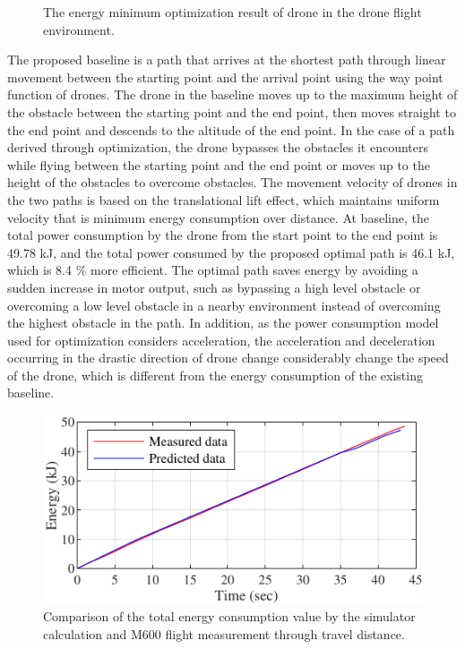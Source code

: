 \documentclass[journal]{./template/IEEEtran}
\begin{document}
\begin{figure}[ht]
\centering
{}
\qquad
{}
\caption{The energy minimum optimization result of drone in the drone flight environment.}
\label{fig: opt_environ}
\end{figure}

The proposed baseline is a path that arrives at the shortest path through linear movement between the starting point and the arrival point using the way point function of drones. The drone in the baseline moves up to the maximum height of the obstacle between the starting point and the end point, then moves straight to the end point and descends to the altitude of the end point. 
In the case of a path derived through optimization, the drone bypasses the obstacles it encounters while flying between the starting point and the end point or moves up to the height of the obstacles to overcome obstacles. 
The movement velocity of drones in the two paths is based on the translational lift effect, which maintains uniform velocity that is minimum energy consumption over distance. 
At baseline, the total power consumption by the drone from the start point to the end point is 49.78 kJ, and the total power consumed by the proposed optimal path is 46.1 kJ, which is 8.4 \% more efficient. The optimal path saves energy by avoiding a sudden increase in motor output, such as bypassing a high level obstacle or overcoming a low level obstacle in a nearby environment instead of overcoming the highest obstacle in the path.
In addition, as the power consumption model used for optimization considers acceleration, the acceleration and deceleration occurring in the drastic direction of drone change considerably change the speed of the drone, which is different from the energy consumption of the existing baseline.

\begin{figure}[ht]
\centering\includegraphics[scale=1.0]{fig14/S_E.pdf}
\caption{Comparison of the total energy consumption value by the simulator calculation and M600 flight measurement through travel distance.}
\label{fig:consumed_energy}
\end{figure}
\end{document}

